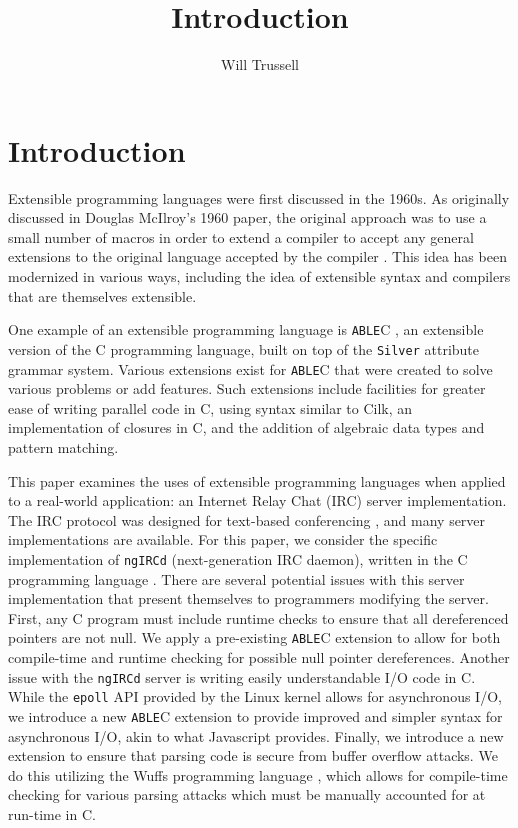 \documentclass[main.tex]{subfiles}
\author{Will Trussell}
\title{Introduction}
\begin{document}
\section{Introduction}

Extensible programming languages were first discussed in the 1960s. As
originally discussed in Douglas McIlroy's 1960 paper, the original approach was
to use a small number of macros in order to extend a compiler to accept any
general extensions to the original language accepted by the compiler 
\cite{7}. This idea has been modernized in various ways, including the idea
of extensible syntax and compilers that are themselves extensible.

One example of an extensible programming language is \verb|ABLE|C \cite{10}, 
an extensible version of the C programming language, built on top of the 
\verb|Silver| \cite{3} attribute grammar system. Various extensions exist for 
\verb|ABLE|C that were created to solve various problems or add features. Such
extensions include facilities for greater ease of writing parallel code in C, using syntax
similar to Cilk\cite{2}, an implementation of closures in C, and the addition of algebraic
data types and pattern matching.

This paper examines the uses of extensible programming languages when applied to a real-world
application: an Internet Relay Chat (IRC) server implementation. The IRC
protocol was designed for text-based conferencing \cite{8}, and
many server implementations are available. For this paper, we consider the
specific implementation of \verb|ngIRCd| (next-generation IRC daemon), written 
in the C programming language \cite{1}. There are several potential issues with this 
server implementation that present themselves to programmers modifying the server. 
First, any C program must include runtime checks to 
ensure that all dereferenced pointers are not null. We apply a pre-existing \verb|ABLE|C extension to 
allow for both compile-time and runtime checking for possible null pointer dereferences.  Another 
issue with the \verb|ngIRCd| server is writing easily understandable I/O code in C. While the 
\verb|epoll| API \cite{5} provided by the Linux kernel allows for asynchronous I/O, 
we introduce a new \verb|ABLE|C extension to provide improved and simpler syntax for 
asynchronous I/O, akin to what Javascript provides. Finally, we introduce a new 
extension to ensure that parsing code is secure from buffer overflow attacks. We do this utilizing the Wuffs 
programming language \cite{6}, which allows for compile-time checking for various 
parsing attacks which must be manually accounted for at run-time in C.
\end{document}
